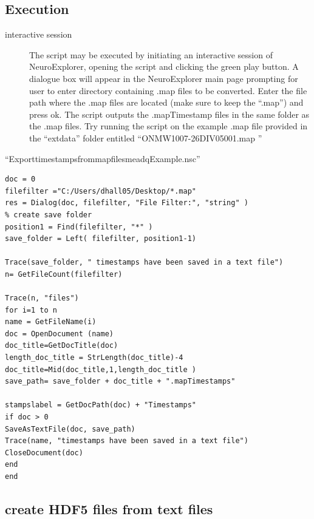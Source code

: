 \documentclass{article}\usepackage[]{graphicx}\usepackage[]{color}
\begin{document}
\subsection*{Execution}
\begin{description}
\item[interactive session] The script may be executed by initiating an interactive session of NeuroExplorer, opening the script and clicking the green play button.  A dialogue box will appear in the NeuroExplorer main page prompting for user to enter directory containing .map files to be converted.  Enter the file path where the .map files are located (make sure to keep the ``.\text{*}map'') and press ok.  The script outputs the .mapTimestamp files in the same folder as the .map files.  Try running the script on the example .map file provided in the ``extdata'' folder entitled ``ON\textunderscore MW1007-26\textunderscore DIV05\textunderscore 001.map ''

\end{description}


``Export\textunderscore timestamps\textunderscore from\textunderscore map\textunderscore files\textunderscore meadqExample.nsc''

\begin{verbatim}
doc = 0
filefilter ="C:/Users/dhall05/Desktop/*.map"
res = Dialog(doc, filefilter, "File Filter:", "string" )
% create save folder
position1 = Find(filefilter, "*" )
save_folder = Left( filefilter, position1-1)

Trace(save_folder, " timestamps have been saved in a text file")
n= GetFileCount(filefilter)

Trace(n, "files")
for i=1 to n
name = GetFileName(i)
doc = OpenDocument (name)
doc_title=GetDocTitle(doc)
length_doc_title = StrLength(doc_title)-4
doc_title=Mid(doc_title,1,length_doc_title )
save_path= save_folder + doc_title + ".mapTimestamps"

stampslabel = GetDocPath(doc) + "Timestamps"
if doc > 0
SaveAsTextFile(doc, save_path)
Trace(name, "timestamps have been saved in a text file")
CloseDocument(doc)
end
end
\end{verbatim}

\subsection{create HDF5 files from text files}
\end{document}

